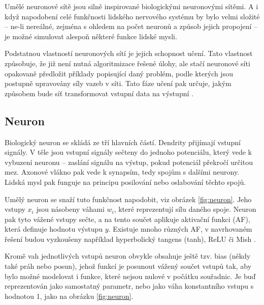 Umělé neuronové sítě jsou silně inspirované biologickými neuronovými sítěmi. A
i když napodobení celé funkčnosti lidského nervového systému by bylo velmi
složité – ne-li nereálné, zejména s ohledem na počet neuronů a způsob jejich
propojení – je možné simulovat alespoň některé funkce lidské mysli.


Podstatnou vlastností neuronových sítí je jejich schopnost učení. Tato
vlastnost způsobuje, že již není nutná algoritmizace řešené úlohy, ale stačí
neuronové síti opakovaně předložit příklady popisující daný problém, podle
kterých jsou postupně upravovány síly vazeb v síti. Tato fáze učení pak určuje,
jakým způsobem bude síť transformovat vstupní data na výstupní
\cite{Vondrak1994}.

\subsection{Neuron}
Biologický neuron se skládá ze tří hlavních částí. Dendrity přijímají vstupní
signály. V těle jsou vstupní signály sečteny do jednoho potenciálu, který vede
k vybuzení neuronu – zaslání signálu na výstup, pokud potenciál překročí
určitou mez. Axonové vlákno pak vede k synapsím, tedy spojům s dalšími neurony.
Lidská mysl pak funguje na principu posilování nebo oslabování těchto spojů.

Umělý neuron se snaží tuto funkčnost napodobit, viz obrázek \ref{fig:neuron}.
Jeho vstupy $x_i$ jsou násobeny váhami $w_i$, které reprezentují sílu daného
spoje. Neuron pak tyto vážené vstupy sečte, a na tento součet aplikuje
aktivační funkci (AF), která definuje hodnotu výstupu $y$. Existuje mnoho
různých AF, v navrhovaném řešení budou vyzkoušeny například hyperbolický tangens (tanh),
ReLU či Mish \cite{afreview}.

Kromě vah jednotlivých vstupů neuron obvykle obsahuje ještě tzv. bias (někdy
také práh nebo posun), jehož funkcí je posunout vážený součet vstupů tak, aby
bylo možné modelovat i funkce, které nejsou nulové v počátku souřadnic. Je buď
reprezentován jako samostatný parametr, nebo jako váha konstantního vstupu s
hodnotou 1, jako na obrázku \ref{fig:neuron}.

